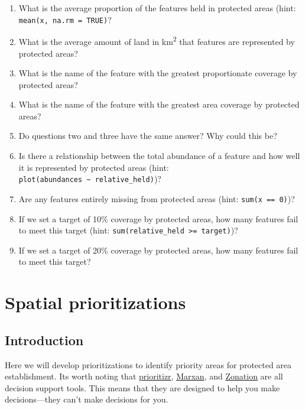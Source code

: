 \documentclass[12pt,]{book}
\providecommand{\tightlist}{%
  \setlength{\itemsep}{0pt}\setlength{\parskip}{0pt}}
\let\BeginKnitrBlock\begin \let\EndKnitrBlock\end
\begin{document}
\BeginKnitrBlock{rmdquestion}
\begin{enumerate}
\def\labelenumi{\arabic{enumi}.}
\tightlist
\item
  What is the average proportion of the features held in protected areas
  (hint: \texttt{mean(x,\ na.rm\ =\ TRUE)}?
\item
  What is the average amount of land in km\textsuperscript{2} that
  features are represented by protected areas?
\item
  What is the name of the feature with the greatest proportionate
  coverage by protected areas?
\item
  What is the name of the feature with the greatest area coverage by
  protected areas?
\item
  Do questions two and three have the same answer? Why could this be?
\item
  Is there a relationship between the total abundance of a feature and
  how well it is represented by protected areas (hint:
  \texttt{plot(abundances\ \textasciitilde{}\ relative\_held)})?
\item
  Are any features entirely missing from protected areas (hint:
  \texttt{sum(x\ ==\ 0)})?
\item
  If we set a target of 10\% coverage by protected areas, how many
  features fail to meet this target (hint:
  \texttt{sum(relative\_held\ \textgreater{}=\ target)})?
\item
  If we set a target of 20\% coverage by protected areas, how many
  features fail to meet this target?
\end{enumerate}
\EndKnitrBlock{rmdquestion}

\chapter{Spatial prioritizations}\label{spatial-prioritizations}

\section{Introduction}\label{introduction-2}

Here we will develop prioritizations to identify priority areas for
protected area establishment. Its worth noting that
\href{https://prioritizr.net/}{prioritizr},
\href{http://marxan.org/}{Marxan}, and
\href{https://www.helsinki.fi/en/researchgroups/digital-geography-lab/software-developed-in-cbig\#section-52992}{Zonation}
are all decision support tools. This means that they are designed to
help you make decisions---they can't make decisions for you.
\end{document}
